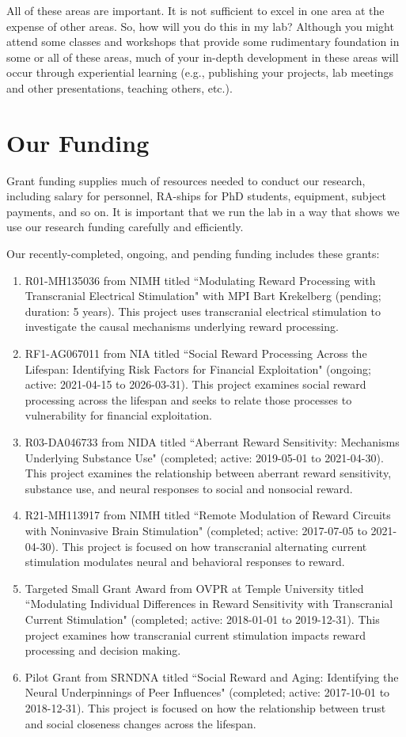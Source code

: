 \documentclass[letterpaper,11pt,oneside]{memoir}
\begin{document}
All of these areas are important. It is not sufficient to excel in one area at the expense of other areas. So, how will you do this in my lab? Although you might attend some classes and workshops that provide some rudimentary foundation in some or all of these areas, much of your in-depth development in these areas will occur through experiential learning (e.g., publishing your projects, lab meetings and other presentations, teaching others, etc.).


\section{Our Funding}

Grant funding supplies much of resources needed to conduct our research, including salary for personnel, RA-ships for PhD students, equipment, subject payments, and so on. It is important that we run the lab in a way that shows we use our research funding carefully and efficiently.

Our recently-completed, ongoing, and pending funding includes these grants:

\begin{enumerate}
\item R01-MH135036 from NIMH titled ``Modulating Reward Processing with Transcranial Electrical Stimulation" with MPI Bart Krekelberg (pending; duration: 5 years). This project uses transcranial electrical stimulation to investigate the causal mechanisms underlying reward processing.
\item RF1-AG067011 from NIA titled ``Social Reward Processing Across the Lifespan: Identifying Risk Factors for Financial Exploitation" (ongoing; active: 2021-04-15 to 2026-03-31). This project examines social reward processing across the lifespan and seeks to relate those processes to vulnerability for financial exploitation.
\item R03-DA046733 from NIDA titled ``Aberrant Reward Sensitivity: Mechanisms Underlying Substance Use" (completed; active: 2019-05-01 to 2021-04-30). This project examines the relationship between aberrant reward sensitivity, substance use, and neural responses to social and nonsocial reward. 
\item R21-MH113917 from NIMH titled ``Remote Modulation of Reward Circuits with Noninvasive Brain Stimulation" (completed; active: 2017-07-05 to 2021-04-30). This project is focused on how transcranial alternating current stimulation modulates neural and behavioral responses to reward. 
\item Targeted Small Grant Award from OVPR at Temple University titled ``Modulating Individual Differences in Reward Sensitivity with Transcranial Current Stimulation" (completed; active: 2018-01-01 to 2019-12-31). This project examines how transcranial current stimulation impacts reward processing and decision making.
\item Pilot Grant from SRNDNA titled ``Social Reward and Aging: Identifying the Neural Underpinnings of Peer Influences" (completed; active: 2017-10-01 to 2018-12-31). This project is focused on how the relationship between trust and social closeness changes across the lifespan. 
\end{enumerate}
\end{document}
